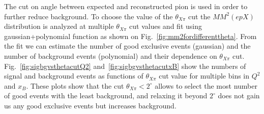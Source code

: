 The cut on angle between expected and reconstructed pion is used in order to further reduce background.
To choose the value of the $\theta_{X\pi}$ cut the $MM^2(epX)$ distribution is analyzed at multiple $\theta_{X\pi}$ cut values and fit using gaussian+polynomial function as shown on Fig.~\ref{fig:mm2fordifferenttheta}.
From the fit we can estimate the number of good exclusive events (gaussian) and the number of background events (polynomial) and their dependence on $\theta_{X\pi}$ cut.
Fig.~\ref{fig:sigbgvsthetacutQ2} and~\ref{fig:sigbgvsthetacutxB} show the numbers of signal and background events as functions of $\theta_{X\pi}$ cut value for multiple bins in $Q^2$ and $x_B$.
These plots show that the cut $\theta_{X\pi}<2^\circ$ allows to select the most number of good events with the least background, and relaxing it beyond $2^\circ$ does not gain us any good exclusive events but increases background.


